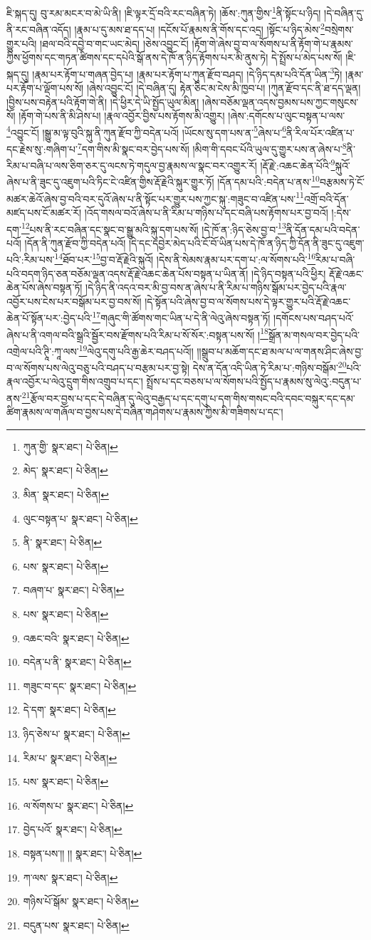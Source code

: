 ཇི་སྐད་དུ། བུ་རམ་མངར་བ་མེ་ཡི་ནི། །ཇི་ལྟར་དྲོ་བའི་རང་བཞིན་ཏེ། །ཆོས་:ཀུན་གྱིས་\footnote{ཀུན་གྱི་  སྣར་ཐང་།  པེ་ཅིན། }ནི་སྟོང་པ་ཉིད། །དེ་བཞིན་དུ་ནི་རང་བཞིན་འདོད། །རྣམ་པ་དུ་མས་ཐ་དད་པ། །དངོས་པོ་རྣམས་ནི་གོས་དང་འདྲ། །སྟོང་པ་ཉིད་མེས་\footnote{མེད་  སྣར་ཐང་།  པེ་ཅིན། }བསྲེགས་གྱུར་པའི། །ཐལ་བའི་དབྱེ་བ་གང་ཡང་མེད། །ཅེས་འབྱུང་ངོ། །རྟོག་གེ་ཞེས་བྱ་བ་ལ་སོགས་པ་ནི་རྟོག་གེ་པ་རྣམས་ཀྱིས་ཕྱོགས་དང་གཏན་ཚིགས་དང་དཔེའི་སྒོ་ནས་དེ་ཁོ་ན་ཉིད་རྟོགས་པར་མི་ནུས་ཏེ། དེ་སྤྲོས་པ་མེད་པས་སོ། །ཇི་སྐད་དུ། །རྣམ་པར་རྟོག་པ་གཞན་བྱེད་པ། །རྣམ་པར་རྟོག་པ་ཀུན་རྫོབ་བཤད། །དེ་ཉིད་དམ་པའི་དོན་ཡིན་\footnote{མིན་  སྣར་ཐང་།  པེ་ཅིན། }ཏེ། །རྣམ་པར་རྟོག་པ་ལྡོག་པས་སོ། །ཞེས་འབྱུང་ངོ། །དེ་བཞིན་དུ། རྟེན་ཅིང་མ་ངེས་མི་ཁྱབ་པ། །ཀུན་རྫོབ་དང་ནི་ཐ་དད་ལྡན། །བྱིས་པས་བརྟེན་པའི་རྟོག་གེ་ནི། །དེ་ཕྱིར་དེ་ཡི་སྤྱོད་ཡུལ་མིན། །ཞེས་བཅོམ་ལྡན་འདས་བྱམས་པས་ཀྱང་གསུངས་སོ། །རྟོག་གེ་པས་ནི་མི་ཤེས་པ། །རྣལ་འབྱོར་བྱིས་པས་རྟོགས་མི་འགྱུར། །ཞེས་:དགོངས་པ་ལུང་བསྟན་པ་ལས་\footnote{ལུང་བསྟན་པ་  སྣར་ཐང་།  པེ་ཅིན། }འབྱུང་ངོ། །སྒྱུ་མ་ལྟ་བུའི་སྐུ་ནི་ཀུན་རྫོབ་ཀྱི་བདེན་པའོ། །ཡོངས་སུ་དག་པས་ན་\footnote{ནི་  སྣར་ཐང་།  པེ་ཅིན། }ཞེས་པ་\footnote{པས་  སྣར་ཐང་།  པེ་ཅིན། }ནི་རིལ་པོར་འཛིན་པ་དང་རྗེས་སུ་:གཞིག་པ་\footnote{བཞག་པ་  སྣར་ཐང་།  པེ་ཅིན། }དག་གིས་མི་སྣང་བར་བྱེད་པས་སོ། །མིག་གི་དབང་པོའི་ཡུལ་དུ་གྱུར་པས་ན་ཞེས་པ་\footnote{པས་  སྣར་ཐང་།  པེ་ཅིན། }ནི་རིམ་པ་བཞི་པ་ལས་ཅིག་ཅར་དུ་ལངས་ཏེ་གདུལ་བྱ་རྣམས་ལ་སྣང་བར་འགྱུར་རོ། །རྡོ་རྗེ་:འཆང་ཆེན་པོའི་\footnote{འཆང་བའི་  སྣར་ཐང་།  པེ་ཅིན། }སྐུའོ་ཞེས་པ་ནི་ཟུང་དུ་འཇུག་པའི་ཏིང་ངེ་འཛིན་གྱིས་རྡོ་རྗེའི་སྐུར་གྱུར་ཏོ། །དོན་དམ་པའི་:བདེན་པ་ནས་\footnote{བདེན་པ་ནི་  སྣར་ཐང་།  པེ་ཅིན། }བརྩམས་ཏེ་ངོ་མཚར་ཆེའོ་ཞེས་བྱ་བའི་བར་དུའོ་ཞེས་པ་ནི་སྟོང་པར་གྱུར་པས་ཀྱང་སྐུ་:གཟུང་བ་འཛིན་པས་\footnote{གཟུང་བ་དང་  སྣར་ཐང་།  པེ་ཅིན། }འགྲོ་བའི་དོན་མཛད་པས་ངོ་མཚར་རོ། །འོད་གསལ་བའོ་ཞེས་པ་ནི་རིམ་པ་གཉིས་པ་དང་བཞི་པས་རྟོགས་པར་བྱ་བའོ། །:དེས་དག་\footnote{དེ་དག་  སྣར་ཐང་།  པེ་ཅིན། }པས་ནི་རང་བཞིན་དང་སྣང་བ་སྒྱུ་མའི་སྐུ་དག་པས་སོ། །དེ་ཁོ་ན་:ཉིད་ཅེས་བྱ་བ་\footnote{ཉིད་ཅེས་པ་  སྣར་ཐང་།  པེ་ཅིན། }ནི་དོན་དམ་པའི་བདེན་པའོ། །དོན་ནི་ཀུན་རྫོབ་ཀྱི་བདེན་པའོ། །དེ་དང་དབྱེར་མེད་པའི་ངོ་བོ་ཡིན་པས་དེ་ཁོ་ན་ཉིད་ཀྱི་དོན་ནི་ཟུང་དུ་འཇུག་པའི་:རིམ་པས་\footnote{རིམ་པ་  སྣར་ཐང་།  པེ་ཅིན། }ཐོབ་པར་\footnote{པས་  སྣར་ཐང་།  པེ་ཅིན། }བྱ་བ་རྡོ་རྗེའི་སྐུའོ། །དེས་ནི་སེམས་རྣམ་པར་དག་པ་:ལ་སོགས་པའི་\footnote{ལ་སོགས་པ་  སྣར་ཐང་།  པེ་ཅིན། }རིམ་པ་བཞི་པའི་བདག་ཉིད་ཅན་བཅོམ་ལྡན་འདས་རྡོ་རྗེ་འཆང་ཆེན་པོས་བསྟན་པ་ཡིན་ནོ། །དེ་ཉིད་བསྟན་པའི་ཕྱིར། རྡོ་རྗེ་འཆང་ཆེན་པོས་ཞེས་བསྟན་ཏོ། །དེ་ཉིད་ནི་འདའ་བར་མི་བྱ་བས་ན་ཞེས་པ་ནི་རིམ་པ་གཉིས་སྒོམ་པར་བྱེད་པའི་རྣལ་འབྱོར་པས་ངེས་པར་བསྒོམ་པར་བྱ་བས་སོ། །དེ་སྟོན་པའི་ཞེས་བྱ་བ་ལ་སོགས་པས་དེ་ལྟར་གྱུར་པའི་རྡོ་རྗེ་འཆང་ཆེན་པོ་སྟོན་པར་:བྱེད་པའི་\footnote{བྱེད་པའོ་  སྣར་ཐང་།  པེ་ཅིན། }གཞུང་གི་ཚོགས་གང་ཡིན་པ་དེ་ནི་ལེའུ་ཞེས་བསྟན་ཏོ། །དགོངས་པས་བཤད་པའོ་ཞེས་པ་ནི་འགལ་བའི་སྒྲའི་སྦྱོར་བས་རྫོགས་པའི་རིམ་པ་སོ་སོར་:བསྟན་པས་སོ། །\footnote{བསྟན་པས་།། །།  སྣར་ཐང་།  པེ་ཅིན། }སྒྲོན་མ་གསལ་བར་བྱེད་པའི་འགྲེལ་པའི་ཊཱི་:ཀཱ་ལས་\footnote{ཀ་ལས་  སྣར་ཐང་།  པེ་ཅིན། }ལེའུ་དགུ་པའི་རྒྱ་ཆེར་བཤད་པའོ།། །།སྒྲུབ་པ་མཆོག་དང་ཐ་མལ་པ་ལ་གནས་ཤིང་ཞེས་བྱ་བ་ལ་སོགས་པས་ལེའུ་བཅུ་པའི་བཤད་པ་བརྩམ་པར་བྱ་སྟེ། དེས་ན་དོན་འདི་ཡིན་ཏེ་རིམ་པ་:གཉིས་བསྒོམ་\footnote{གཉིས་པོ་སྒོམ་  སྣར་ཐང་།  པེ་ཅིན། }པའི་རྣལ་འབྱོར་པ་ལེའུ་དྲུག་གིས་འགྲུབ་པ་དང་། སྤྲོས་པ་དང་བཅས་པ་ལ་སོགས་པའི་སྤྱོད་པ་རྣམས་སུ་ལེའུ་:བདུན་པ་ནས་\footnote{བདུན་པས་  སྣར་ཐང་།  པེ་ཅིན། }རྩོལ་བར་བྱས་པ་དང་དེ་བཞིན་དུ་ལེའུ་བརྒྱད་པ་དང་དགུ་པ་དག་གིས་གསང་བའི་དབང་བསྐུར་དང་དམ་ཚིག་རྣམས་ལ་གཞོལ་བ་བྱས་པས་དེ་བཞིན་གཤེགས་པ་རྣམས་ཀྱིས་མི་གཟིགས་པ་དང་། 